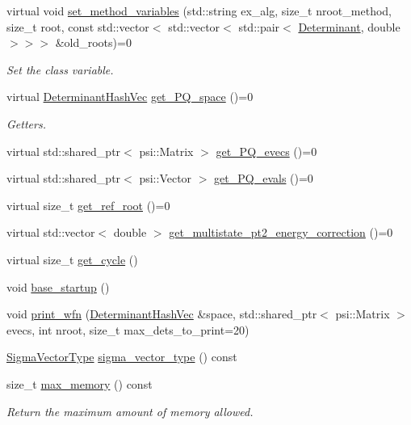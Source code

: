 \begin{DoxyCompactItemize}
virtual void \mbox{\hyperlink{classforte_1_1_selected_c_i_method_a37f95503d0241387195dc7d412fc6e78}{set\+\_\+method\+\_\+variables}} (std\+::string ex\+\_\+alg, size\+\_\+t nroot\+\_\+method, size\+\_\+t root, const std\+::vector$<$ std\+::vector$<$ std\+::pair$<$ \mbox{\hyperlink{namespaceforte_a2076c63fd7b8732004d9e1442ce527c1}{Determinant}}, double $>$$>$$>$ \&old\+\_\+roots)=0
\begin{DoxyCompactList}\small\item\em Set the class variable. \end{DoxyCompactList}\item 
virtual \mbox{\hyperlink{classforte_1_1_determinant_hash_vec}{Determinant\+Hash\+Vec}} \mbox{\hyperlink{classforte_1_1_selected_c_i_method_a2c29d8700d6887860850f77b9246ec9f}{get\+\_\+\+P\+Q\+\_\+space}} ()=0
\begin{DoxyCompactList}\small\item\em Getters. \end{DoxyCompactList}\item 
virtual std\+::shared\+\_\+ptr$<$ psi\+::\+Matrix $>$ \mbox{\hyperlink{classforte_1_1_selected_c_i_method_a5e5212836aa0dc35f98238d1f426abed}{get\+\_\+\+P\+Q\+\_\+evecs}} ()=0
\item 
virtual std\+::shared\+\_\+ptr$<$ psi\+::\+Vector $>$ \mbox{\hyperlink{classforte_1_1_selected_c_i_method_a675d28ae66341b8cfabb2953c936621c}{get\+\_\+\+P\+Q\+\_\+evals}} ()=0
\item 
virtual size\+\_\+t \mbox{\hyperlink{classforte_1_1_selected_c_i_method_aa95ed581568b2d580c17ab166e85a11a}{get\+\_\+ref\+\_\+root}} ()=0
\item 
virtual std\+::vector$<$ double $>$ \mbox{\hyperlink{classforte_1_1_selected_c_i_method_abbe18ea3e5f1a77df13a38764aeef62c}{get\+\_\+multistate\+\_\+pt2\+\_\+energy\+\_\+correction}} ()=0
\item 
virtual size\+\_\+t \mbox{\hyperlink{classforte_1_1_selected_c_i_method_a50f16f61344cf98ed8c2351209725702}{get\+\_\+cycle}} ()
\item 
void \mbox{\hyperlink{classforte_1_1_selected_c_i_method_ad7d8f31d3808dd907c3a593f6b1b58df}{base\+\_\+startup}} ()
\item 
void \mbox{\hyperlink{classforte_1_1_selected_c_i_method_a178a959c5c09675cdd355bf3e08cedfe}{print\+\_\+wfn}} (\mbox{\hyperlink{classforte_1_1_determinant_hash_vec}{Determinant\+Hash\+Vec}} \&space, std\+::shared\+\_\+ptr$<$ psi\+::\+Matrix $>$ evecs, int nroot, size\+\_\+t max\+\_\+dets\+\_\+to\+\_\+print=20)
\item 
\mbox{\hyperlink{namespaceforte_a94410e08f0cf9a0cfc5e53c70b6bf485}{Sigma\+Vector\+Type}} \mbox{\hyperlink{classforte_1_1_selected_c_i_method_ab4347d6014f0f0407d7844586c965674}{sigma\+\_\+vector\+\_\+type}} () const
\item 
size\+\_\+t \mbox{\hyperlink{classforte_1_1_selected_c_i_method_ac7c6e32a3877bc8d94e0a17261a4f3c6}{max\+\_\+memory}} () const
\begin{DoxyCompactList}\small\item\em Return the maximum amount of memory allowed. \end{DoxyCompactList}\end{DoxyCompactItemize}

